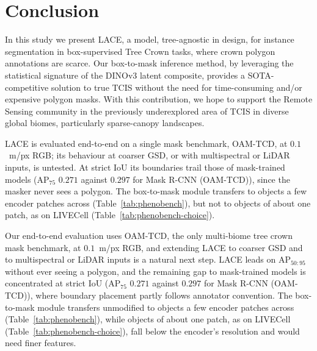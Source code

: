 \documentclass[remotesensing,article,submit,moreauthors]{Definitions/mdpi}
\begin{document}
\section{Conclusion}

In this study we present LACE, a model, tree-agnostic in design, for instance segmentation in box-supervised Tree Crown tasks, where crown polygon annotations are scarce. Our box-to-mask inference method, by leveraging the statistical signature of the DINOv3 latent composite, provides a SOTA-competitive solution to true TCIS without the need for time-consuming and/or expensive polygon masks. With this contribution, we hope to support the Remote Sensing community in the previously underexplored area of TCIS in diverse global biomes, particularly sparse-canopy landscapes. 

LACE is evaluated end-to-end on a single mask benchmark, OAM-TCD, at $0.1$~m/px RGB; its behaviour at coarser GSD, or with multispectral or LiDAR inputs, is untested. At strict IoU its boundaries trail those of mask-trained models (AP$_{75}$ $0.271$ against $0.297$ for Mask R-CNN (OAM-TCD)), since the masker never sees a polygon. The box-to-mask module transfers to objects a few encoder patches across (Table~\ref{tab:phenobench}), but not to objects of about one patch, as on LIVECell (Table~\ref{tab:phenobench-choice}).

Our end-to-end evaluation uses OAM-TCD, the only multi-biome tree crown mask benchmark, at $0.1$~m/px RGB, and extending LACE to coarser GSD and to multispectral or LiDAR inputs is a natural next step. LACE leads on AP$_{50:95}$ without ever seeing a polygon, and the remaining gap to mask-trained models is concentrated at strict IoU (AP$_{75}$ $0.271$ against $0.297$ for Mask R-CNN (OAM-TCD)), where boundary placement partly follows annotator convention. The box-to-mask module transfers unmodified to objects a few encoder patches across (Table~\ref{tab:phenobench}), while objects of about one patch, as on LIVECell (Table~\ref{tab:phenobench-choice}), fall below the encoder's resolution and would need finer features.



\end{document}
